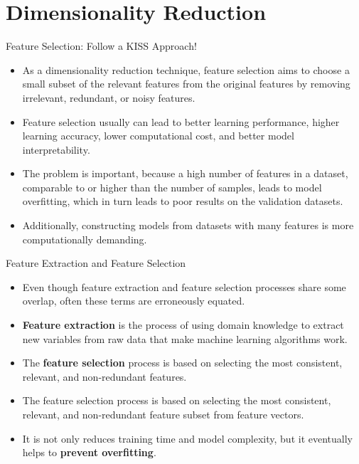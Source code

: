 \documentclass[11pt]{beamer}
\begin{document}
\section{Dimensionality Reduction}
%
%
\begin{frame}{Feature Selection: Follow a KISS Approach!}
	\begin{itemize}
		\item As a dimensionality reduction technique, feature selection aims to choose a small subset of the relevant features from the original features by removing irrelevant, redundant, or noisy features. 
		\item Feature selection usually can lead to better learning performance, higher learning accuracy, lower computational cost, and better model interpretability.
		\item The problem is important, because a high number of features in a dataset, comparable to or higher than the number of samples, leads to model overfitting, which in turn leads to poor results on the validation datasets. 
		\item Additionally, constructing models from datasets with many features is more computationally demanding.
	\end{itemize}
\end{frame}
%
%
\begin{frame}{Feature Extraction and Feature Selection}
	\begin{itemize}
		\item Even though feature extraction and feature selection processes share some overlap, often these terms are erroneously equated. 
		\item \textbf{Feature extraction} is the process of using domain knowledge to extract new variables from raw data that make machine learning algorithms work. 
		\item The \textbf{feature selection} process is based on selecting the most consistent, relevant, and non-redundant features.
		\item The feature selection process is based on selecting the most consistent, relevant, and non-redundant feature subset from feature vectors. 
		\item It is not only reduces training time and model complexity, but it eventually helps to \textbf{prevent overfitting}.
	\end{itemize}
\end{frame}
\end{document}
